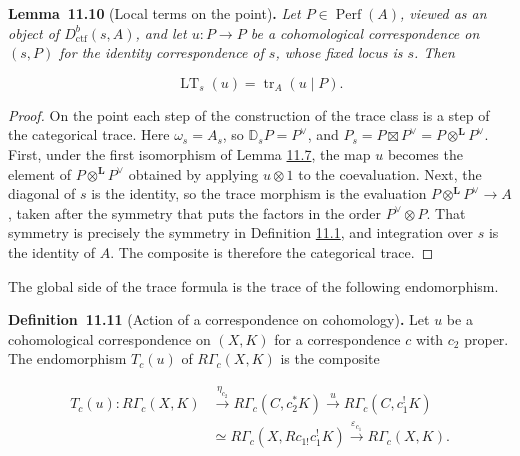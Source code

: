 \documentclass[11pt]{article}
\newenvironment{bpstatement}[2]{\par\addvspace{0.6\baselineskip}\noindent\textbf{#1}#2\textbf{.}\enspace\ignorespaces}
  {\par\addvspace{0.4\baselineskip}}
\newenvironment{bpstatementit}[2]{\begin{bpstatement}{#1}{#2}\itshape\ignorespaces}{\end{bpstatement}}
\begin{document}
\label{bp199}%
\begin{bpstatementit}{Lemma~11.10}{ (Local terms on the point)}
Let \(P\in\operatorname{Perf}(A)\), viewed as an object of \(D^b_{\mathrm{ctf}}(s,A)\), and let \(u:P\to P\) be a cohomological correspondence on \((s,P)\) for the identity correspondence of \(s\), whose fixed locus is \(s\). Then

\[
\operatorname{LT}_s(u)=\operatorname{tr}_A(u\mid P).
\]
\end{bpstatementit}

\begin{proof}[{Proof}]\label{bp200}%
On the point each step of the construction of the trace class is a step of the categorical trace. Here \(\omega_s=A_s\), so \(\mathbb D_sP=P^\vee\), and \(P_s=P\boxtimes
P^\vee=P\otimes^{\mathbf L}P^\vee\). First, under the first isomorphism of Lemma \hyperref[bp191]{11.7}, the map \(u\) becomes the element of \(P\otimes^{\mathbf L}P^\vee\) obtained by applying \(u\otimes1\) to the coevaluation. Next, the diagonal of \(s\) is the identity, so the trace morphism is the evaluation \(P\otimes^{\mathbf L}P^\vee\to A\), taken after the symmetry that puts the factors in the order \(P^\vee\otimes P\). That symmetry is precisely the symmetry in Definition \hyperref[bp174]{11.1}, and integration over \(s\) is the identity of \(A\). The composite is therefore the categorical trace.
\end{proof}

\label{bp201}%
The global side of the trace formula is the trace of the following endomorphism.

\label{bp202}%
\begin{bpstatement}{Definition~11.11}{ (Action of a correspondence on cohomology)}
Let \(u\) be a cohomological correspondence on \((X,K)\) for a correspondence \(c\) with \(c_2\) proper. The endomorphism \(T_c(u)\) of \(R\Gamma_c(X,K)\) is the composite

\[
\begin{aligned}
T_c(u):R\Gamma_c(X,K)&\xrightarrow{\eta_{c_2}}
R\Gamma_c(C,c_2^*K)\xrightarrow{u}R\Gamma_c(C,c_1^!K)\\
&\simeq R\Gamma_c(X,Rc_{1!}c_1^!K)
\xrightarrow{\varepsilon_{c_1}}R\Gamma_c(X,K).
\end{aligned}
\]
\end{bpstatement}
\end{document}
